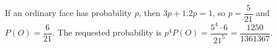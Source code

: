 If an ordinary face has probability $p$, then $3p+1.2p=1$, so $p=\dfrac{5}{21}$ and $P(O)=\dfrac{6}{21}$. The requested probability is $p^4P(O)=\dfrac{5^4\cdot6}{21^5}=\boxed{\dfrac{1250}{1361367}}$.

